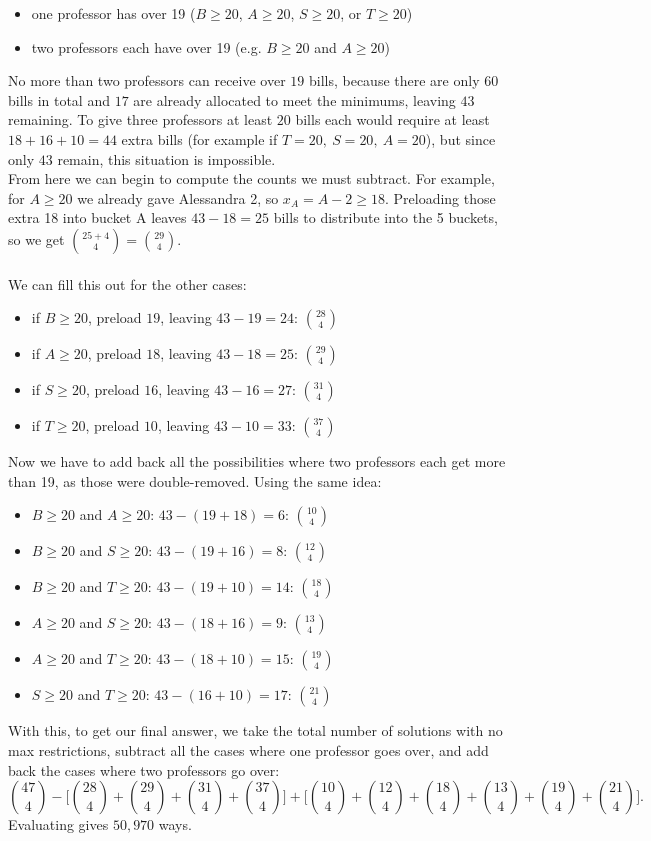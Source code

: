 \documentclass{article}
\begin{document}
\begin{itemize}
    \item one professor has over 19 ($B\ge20$, $A\ge20$, $S\ge20$, or $T\ge20$)
    \item two professors each have over 19 (e.g. $B\ge20$ and $A\ge20$)
\end{itemize}
No more than two professors can receive over $19$ bills, because there are only $60$ bills in total and $17$ are already allocated to meet the minimums, leaving $43$ remaining. To give three professors at least $20$ bills each would require at least $18+16+10=44$ extra bills (for example if $T=20,\ S=20,\ A=20$), but since only $43$ remain, this situation is impossible.\\
From here we can begin to compute the counts we must subtract. For example, for $A\ge20$ we already gave Alessandra 2, so $x_A=A-2\ge18$. Preloading those extra 18 into bucket A leaves $43-18=25$ bills to distribute into the 5 buckets, so we get $\binom{25+4}{4}=\binom{29}{4}$. \\\\
We can fill this out for the other cases:
\begin{itemize}
    \item if $B\ge20$, preload $19$, leaving $43-19=24$: $\binom{28}{4}$
    \item if $A\ge20$, preload $18$, leaving $43-18=25$: $\binom{29}{4}$
    \item if $S\ge20$, preload $16$, leaving $43-16=27$: $\binom{31}{4}$
    \item if $T\ge20$, preload $10$, leaving $43-10=33$: $\binom{37}{4}$
\end{itemize}
Now we have to add back all the possibilities where two professors each get more than 19, as those were double-removed. Using the same idea:
\begin{itemize}
    \item $B\ge20$ and $A\ge20$: $43-(19+18)=6$: $\binom{10}{4}$
    \item $B\ge20$ and $S\ge20$: $43-(19+16)=8$: $\binom{12}{4}$
    \item $B\ge20$ and $T\ge20$: $43-(19+10)=14$: $\binom{18}{4}$
    \item $A\ge20$ and $S\ge20$: $43-(18+16)=9$: $\binom{13}{4}$
    \item $A\ge20$ and $T\ge20$: $43-(18+10)=15$: $\binom{19}{4}$
    \item $S\ge20$ and $T\ge20$: $43-(16+10)=17$: $\binom{21}{4}$
\end{itemize}
With this, to get our final answer, we take the total number of solutions with no max restrictions, subtract all the cases where one professor goes over, and add back the cases where two professors go over:
\[
\binom{47}{4}
-\bigl[\binom{28}{4}+\binom{29}{4}+\binom{31}{4}+\binom{37}{4}\bigr]
+\bigl[\binom{10}{4}+\binom{12}{4}+\binom{18}{4}+\binom{13}{4}+\binom{19}{4}+\binom{21}{4}\bigr].
\]
Evaluating gives $50{,}970$ ways.
\end{document}
